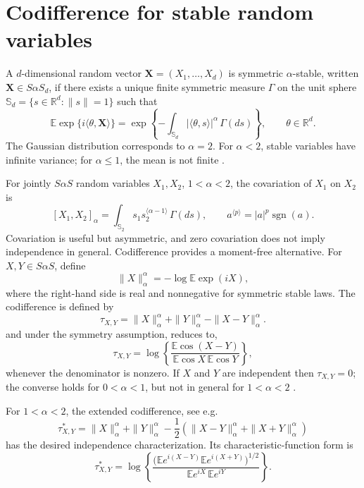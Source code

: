 \documentclass[11pt]{article}
\theoremstyle{definition}
\newcommand{\R}{\mathbb{R}}
\newcommand{\E}{\mathbb{E}}
\newcommand{\Sph}{\mathbb{S}}
\newcommand{\bfX}{\mathbf{X}}
\newcommand{\sgn}{\operatorname{sgn}}
\begin{document}
\section{Codifference for stable random variables}\label{sec:codiff}

A $d$-dimensional random vector \(\bfX=(X_1,\ldots,X_d)\) is symmetric \(\alpha\)-stable, written \(\bfX\in S\alpha S_d\), if there exists a unique finite symmetric measure \(\Gamma\) on the unit sphere \(\Sph_d=\{s\in\R^d:\|s\|=1\}\) such that
\begin{equation}\label{eq:stable_cf}
\E\exp\{i\langle \theta,\bfX\rangle\}
=\exp\left\{-\int_{\Sph_d}|\langle \theta,s\rangle|^\alpha\,\Gamma(ds)\right\},
\qquad \theta\in\R^d.
\end{equation}
The Gaussian distribution corresponds to \(\alpha=2\).  For \(\alpha<2\), stable variables have infinite variance; for \(\alpha\leq 1\), the mean is not finite \citep{Nolan,Samorodnitsky:Taqqu:1994}.

For jointly \(S\alpha S\) random variables \(X_1,X_2\), \(1<\alpha<2\), the covariation of \(X_1\) on \(X_2\) is
\begin{equation}\label{eq:covariation}
[X_1,X_2]_\alpha=\int_{\Sph_2}s_1s_2^{\langle\alpha-1\rangle}\,\Gamma(ds),
\qquad a^{\langle p\rangle}=|a|^p\sgn(a).
\end{equation}
Covariation is useful but asymmetric, and zero covariation does not imply independence in general.  Codifference provides a moment-free alternative.  For \(X,Y\in S\alpha S\), define
\begin{equation}\label{eq:stable_norm}
\|X\|_\alpha^\alpha=-\log \E\exp(iX),
\end{equation}
where the right-hand side is real and nonnegative for symmetric stable laws.  The codifference is
defined by \begin{equation}\label{eq:classical_codiff}
\tau_{X,Y}=\|X\|_\alpha^\alpha+\|Y\|_\alpha^\alpha-\|X-Y\|_\alpha^\alpha .
\end{equation}
and under the symmetry assumption, reduces to,
\begin{equation}\label{eq:classical_codiff_cf}
\tau_{X,Y}=\log\left\{\frac{\E\cos(X-Y)}{\E\cos X\,\E\cos Y}\right\},
\end{equation}
whenever the denominator is nonzero.  If \(X\) and \(Y\) are independent then \(\tau_{X,Y}=0\); the converse holds for \(0<\alpha<1\), but not in general for \(1<\alpha<2\) \citep{Samorodnitsky:Taqqu:1994}.

For \(1<\alpha<2\), the extended codifference,  see e.g. \citep{maroufy2025measure} 
\begin{equation}\label{eq:extended_codiff}
\tau^*_{X,Y}=\|X\|_\alpha^\alpha+\|Y\|_\alpha^\alpha
-\frac{1}{2}\left(\|X-Y\|_\alpha^\alpha+\|X+Y\|_\alpha^\alpha\right)
\end{equation}
has the desired independence characterization.  Its characteristic-function form is
\begin{equation}\label{eq:extended_codiff_cf}
\tau^*_{X,Y}=\log\left\{
\frac{\big(\E e^{i(X-Y)}\E e^{i(X+Y)}\big)^{1/2}}
{\E e^{iX}\,\E e^{iY}}
\right\}.
\end{equation}
\end{document}

